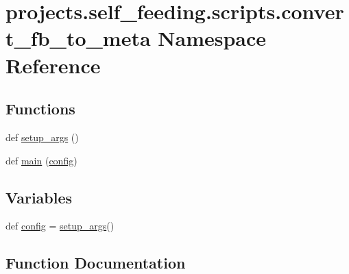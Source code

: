 \hypertarget{namespaceprojects_1_1self__feeding_1_1scripts_1_1convert__fb__to__meta}{}\section{projects.\+self\+\_\+feeding.\+scripts.\+convert\+\_\+fb\+\_\+to\+\_\+meta Namespace Reference}
\label{namespaceprojects_1_1self__feeding_1_1scripts_1_1convert__fb__to__meta}
\subsection*{Functions}
\begin{DoxyCompactItemize}
\item 
def \hyperlink{namespaceprojects_1_1self__feeding_1_1scripts_1_1convert__fb__to__meta_a4e7b9af677e57ec059b5011985d1ad87}{setup\+\_\+args} ()
\item 
def \hyperlink{namespaceprojects_1_1self__feeding_1_1scripts_1_1convert__fb__to__meta_ab61505eb662980f495ad77fc2f48e76c}{main} (\hyperlink{namespaceprojects_1_1self__feeding_1_1scripts_1_1convert__fb__to__meta_a43f0bd10ee254dc97767b835bc639b90}{config})
\end{DoxyCompactItemize}
\subsection*{Variables}
\begin{DoxyCompactItemize}
\item 
def \hyperlink{namespaceprojects_1_1self__feeding_1_1scripts_1_1convert__fb__to__meta_a43f0bd10ee254dc97767b835bc639b90}{config} = \hyperlink{namespaceprojects_1_1self__feeding_1_1scripts_1_1convert__fb__to__meta_a4e7b9af677e57ec059b5011985d1ad87}{setup\+\_\+args}()
\end{DoxyCompactItemize}


\subsection{Function Documentation}
\mbox{\label{namespaceprojects_1_1self__feeding_1_1scripts_1_1convert__fb__to__meta_ab61505eb662980f495ad77fc2f48e76c}} 
